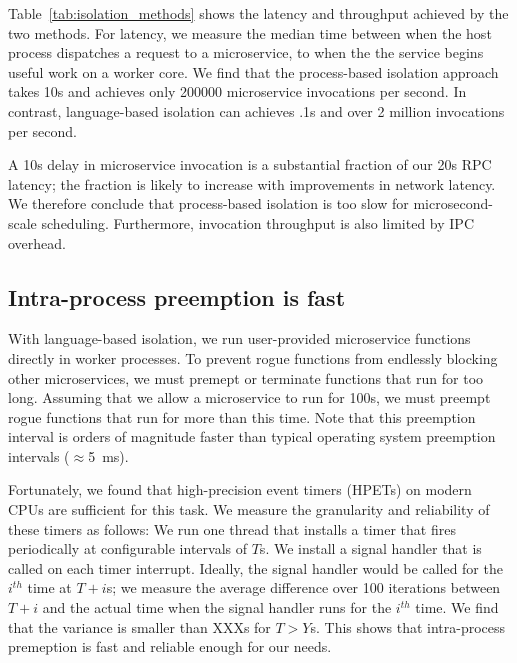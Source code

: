 Table~\ref{tab:isolation_methods} shows the latency and throughput achieved
by the two methods. For latency, we measure the median time between when the host
process dispatches a request to a microservice, to when the the service begins
useful work on a worker core. We find that the process-based isolation approach
takes 10\textmu{}s and achieves only 200000 microservice invocations per
second. In contrast, language-based isolation can achieves .1\textmu{}s and
over 2 million invocations per second.

A 10\textmu{}s delay in microservice invocation is a substantial fraction of our
20\textmu{}s RPC latency; the fraction is likely to increase with
improvements in network latency. We therefore conclude that process-based
isolation is too slow for microsecond-scale scheduling. Furthermore, invocation
throughput is also limited by IPC overhead.

\subsection{Intra-process preemption is fast}
With language-based isolation, we run user-provided microservice functions
directly in worker processes. To prevent rogue functions from endlessly blocking
other microservices, we must premept or terminate functions that run for too
long. Assuming that we allow a microservice to run for 100\textmu{}s, we must
preempt rogue functions that run for more than this time. Note that this
preemption interval is orders of magnitude faster than typical operating
system preemption intervals ($\approx$5~ms).

Fortunately, we found that high-precision event timers (HPETs) on modern CPUs
are sufficient for this task. We measure the granularity and reliability of
these timers as follows: We run one thread that installs a timer that fires
periodically at configurable intervals of $T$\textmu{}s. We install a signal
handler that is called on each timer interrupt. Ideally, the signal handler
would be called for the $i^{th}$ time at $T + i$\textmu{}s; we measure the
average difference over 100 iterations between $T + i$ and the actual time
when the signal handler runs for the $i^{th}$ time. We find that the variance
is smaller than XXX\textmu{}s for $T > Y$\textmu{}s. This shows that
intra-process premeption is fast and reliable enough for our needs.

